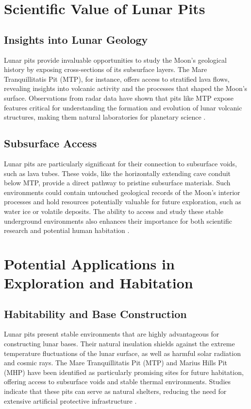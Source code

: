 \documentclass[12pt]{article}
\begin{document}
\section{Scientific Value of Lunar Pits}

\subsection{Insights into Lunar Geology}
Lunar pits provide invaluable opportunities to study the Moon's geological history by exposing cross-sections of its subsurface layers. The Mare Tranquillitatis Pit (MTP), for instance, offers access to stratified lava flows, revealing insights into volcanic activity and the processes that shaped the Moon's surface. Observations from radar data have shown that pits like MTP expose features critical for understanding the formation and evolution of lunar volcanic structures, making them natural laboratories for planetary science \cite{Carrer2024}.

\subsection{Subsurface Access}
Lunar pits are particularly significant for their connection to subsurface voids, such as lava tubes. These voids, like the horizontally extending cave conduit below MTP, provide a direct pathway to pristine subsurface materials. Such environments could contain untouched geological records of the Moon’s interior processes and hold resources potentially valuable for future exploration, such as water ice or volatile deposits. The ability to access and study these stable underground environments also enhances their importance for both scientific research and potential human habitation \cite{Carrer2024}.





\section{Potential Applications in Exploration and Habitation}

\subsection{Habitability and Base Construction}
Lunar pits present stable environments that are highly advantageous for constructing lunar bases. Their natural insulation shields against the extreme temperature fluctuations of the lunar surface, as well as harmful solar radiation and cosmic rays. The Mare Tranquillitatis Pit (MTP) and Marius Hills Pit (MHP) have been identified as particularly promising sites for future habitation, offering access to subsurface voids and stable thermal environments. Studies indicate that these pits can serve as natural shelters, reducing the need for extensive artificial protective infrastructure \cite{thermal-lunar-pits, Carrer2024, lunar-base-marius-hills}.
\end{document}
